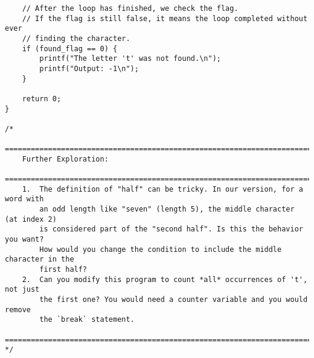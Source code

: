 \documentclass[11pt]{book}
\begin{document}
\begin{verbatim}
    // After the loop has finished, we check the flag.
    // If the flag is still false, it means the loop completed without ever
    // finding the character.
    if (found_flag == 0) {
        printf("The letter 't' was not found.\n");
        printf("Output: -1\n");
    }

    return 0;
}

/*
    ================================================================================
    Further Exploration:
    ================================================================================
    1.  The definition of "half" can be tricky. In our version, for a word with
        an odd length like "seven" (length 5), the middle character (at index 2)
        is considered part of the "second half". Is this the behavior you want?
        How would you change the condition to include the middle character in the
        first half?
    2.  Can you modify this program to count *all* occurrences of 't', not just
        the first one? You would need a counter variable and you would remove
        the `break` statement.
    ================================================================================
*/

\end{verbatim}
\clearpage
\end{document}
